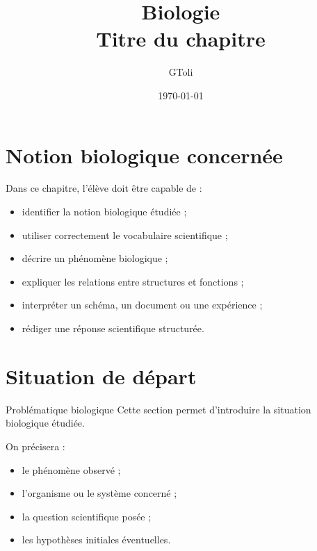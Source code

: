 \documentclass[11pt,a4paper]{article}
\title{\textbf{Biologie}\\[0.2cm]
\large Titre du chapitre}
\author{GToli}
\date{\today}
\begin{document}
\maketitle

\section{Notion biologique concernée}

\begin{cadreobjectif}
Dans ce chapitre, l’élève doit être capable de :
\begin{itemize}
    \item identifier la notion biologique étudiée ;
    \item utiliser correctement le vocabulaire scientifique ;
    \item décrire un phénomène biologique ;
    \item expliquer les relations entre structures et fonctions ;
    \item interpréter un schéma, un document ou une expérience ;
    \item rédiger une réponse scientifique structurée.
\end{itemize}
\end{cadreobjectif}

\section{Situation de départ}

\begin{cadrebleu}{Problématique biologique}
Cette section permet d’introduire la situation biologique étudiée.

\medskip

On précisera :
\begin{itemize}
    \item le phénomène observé ;
    \item l’organisme ou le système concerné ;
    \item la question scientifique posée ;
    \item les hypothèses initiales éventuelles.
\end{itemize}
\end{cadrebleu}

\end{document}
